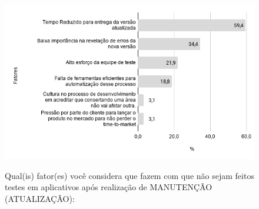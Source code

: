     
        \begin{figure}[!htb]
        \centering
        \includegraphics[width=.80\textwidth]{images/s_fatorestestemanutencao.png}
        \label{figure:s_fatorestestemanutencao}
        \caption{Qual(is) fator(es) você considera que fazem com que não sejam feitos testes em aplicativos após realização de MANUTENÇÃO (ATUALIZAÇÃO):}
        \end{figure}
    

    
